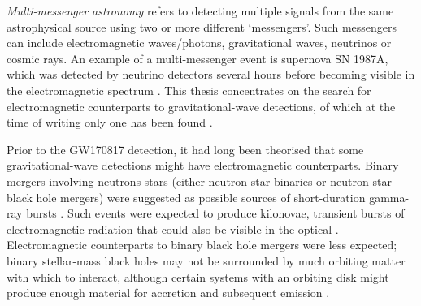 \begin{colsection}

\emph{Multi-messenger astronomy} refers to detecting multiple signals from the same astrophysical source using two or more different `messengers'. Such messengers can include electromagnetic waves/photons, gravitational waves, neutrinos or cosmic rays. An example of a multi-messenger event is supernova SN 1987A, which was detected by neutrino detectors several hours before becoming visible in the electromagnetic spectrum \citep{SN1987A}. This thesis concentrates on the search for electromagnetic counterparts to gravitational-wave detections, of which at the time of writing only one has been found \citep[GW170817;][]{GW170817}.

Prior to the GW170817 detection, it had long been theorised that some gravitational-wave detections might have electromagnetic counterparts. Binary mergers involving neutrons stars (either neutron star binaries or neutron star-black hole mergers) were suggested as possible sources of short-duration gamma-ray bursts \citep{SGRBs}. Such events were expected to produce kilonovae, transient bursts of electromagnetic radiation that could also be visible in the optical \citep[these events were named ``kilo''-novae as they were predicted to reach luminosities approximately 1000 times that of a classical nova;][]{GW_kilonova}. Electromagnetic counterparts to binary black hole mergers were less expected; binary stellar-mass black holes may not be surrounded by much orbiting matter with which to interact, although certain systems with an orbiting disk might produce enough material for accretion and subsequent emission \citep{BBH_EM}.

\end{colsection}


